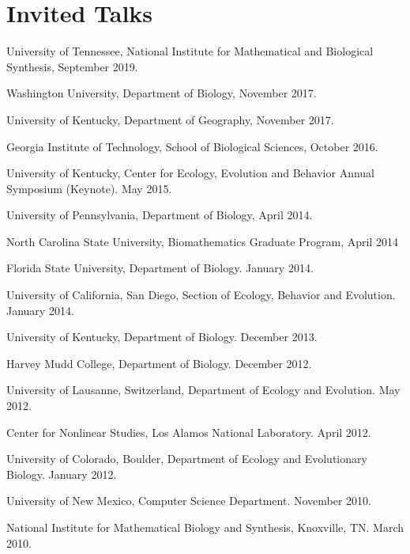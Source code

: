 \documentclass[11pt]{article}
\begin{document}
  \section{Invited Talks}
  \begin{compactlist}
  \item University of Tennessee, National Institute for Mathematical and Biological Synthesis, September 2019.
  \item Washington University, Department of Biology, November 2017.
  \item University of Kentucky, Department of Geography, November 2017.
  \item Georgia Institute of Technology, School of Biological Sciences, October 2016.
  \item University of Kentucky, Center for Ecology, Evolution and Behavior Annual Symposium (Keynote). May 2015.
  \item University of Pennsylvania, Department of Biology, April 2014.
  \item North Carolina State University, Biomathematics Graduate Program, April 2014
  \item Florida State University, Department of Biology.  January 2014.
  \item University of California, San Diego, Section of Ecology, Behavior and Evolution.  January 2014.
  \item University of Kentucky, Department of Biology. December 2013.
  \item Harvey Mudd College, Department of Biology. December 2012.
  \item %
    University of Lausanne, Switzerland, Department of Ecology and Evolution. May 2012.
  \item %
    Center for Nonlinear Studies, Los Alamos National Laboratory. April 2012.
  \item %
    University of Colorado, Boulder, Department of Ecology and Evolutionary Biology. January 2012.
  \item %
    University of New Mexico, Computer Science Department. November 2010.
  \item %
    National Institute for Mathematical Biology and Synthesis, Knoxville, TN. March 2010.
  \end{compactlist}  
\end{document}
